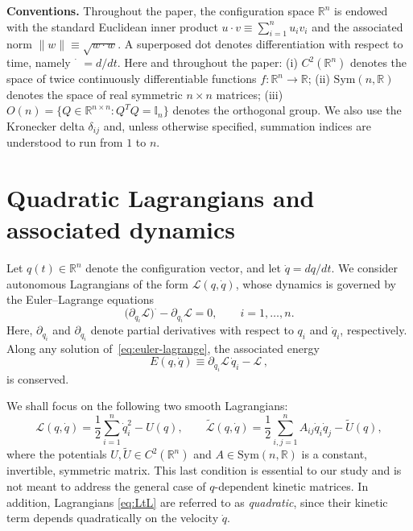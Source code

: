 \documentclass{rendiconti}
\begin{document}
\textbf{Conventions.} Throughout the paper, the configuration space $\mathbb{R}^n$ is endowed with the standard Euclidean inner
product $u\cdot v\equiv\sum_{i=1}^nu_iv_i$ and the associated norm $\|w\|\equiv\sqrt{w\cdot w}$. A superposed dot denotes differentiation with respect to time, namely
$\dot{\phantom{x}}=d/dt$. Here and throughout the paper:
(i) $C^2(\mathbb{R}^n)$ denotes the space of twice continuously differentiable
functions $f:\mathbb{R}^n\to\mathbb{R}$;
(ii) $\mathrm{Sym}(n,\mathbb{R})$ denotes the space of real symmetric
$n\times n$ matrices;
(iii)
$O(n)=\{Q\in\mathbb{R}^{n\times n} : Q^T Q=\mathbb I_n\}$
denotes the orthogonal group.
We also use the Kronecker delta $\delta_{ij}$ and, unless otherwise specified,
summation indices are understood to run from $1$ to $n$.



\section{Quadratic Lagrangians and associated dynamics}
\label{sec:mmm}

Let $q(t)\in\mathbb{R}^n$ denote the configuration vector, and let $\dot q = dq/dt$.
We consider autonomous Lagrangians of the form $\mathcal L(q,\dot q)$, whose
dynamics is governed by the Euler--Lagrange equations
\begin{equation}
\label{eq:euler-lagrange}
\big(\partial_{\dot q_i}\mathcal L\big)^{\cdot}
-
\partial_{q_i}\mathcal L
=
0,
\qquad
i=1,\dots,n.
\end{equation}
Here, $\partial_{q_i}$ and $\partial_{\dot q_i}$ denote partial derivatives with
respect to $q_i$ and $\dot q_i$, respectively.
Along any solution of~\eqref{eq:euler-lagrange}, the associated energy
\begin{equation}
\label{eq:energy}
E(q,\dot q)
\equiv
\partial_{\dot q_i}\mathcal L\,\dot q_i-\mathcal L\,,
\end{equation}
is conserved.

We shall focus on the following two smooth Lagrangians:
\begin{equation}
\label{eq:LtL}
\mathcal{L}(q,\dot q)
=
\frac{1}{2} \sum_{i=1}^n \dot q_i^2 - U(q),
\qquad
\widetilde {\mathcal{L}}(q,\dot q)
=
\frac{1}{2} \sum_{i,j=1}^n A_{ij} \dot q_i \dot q_j - \widetilde U(q),
\end{equation}
where the potentials $U,\widetilde U\in C^2(\mathbb{R}^n)$ and
$A\in\mathrm{Sym}(n,\mathbb{R})$ is a constant, invertible, symmetric matrix. 
This last condition is essential to our study and is not meant to address the
general case of $q$-dependent kinetic matrices. In addition,  Lagrangians \eqref{eq:LtL} are referred to as \emph{quadratic}, since their kinetic term depends quadratically on the velocity $\dot q$.
\end{document}
